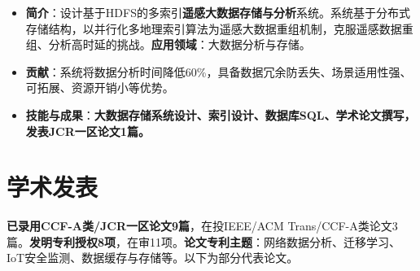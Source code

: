 \documentclass[UTF8,letterpaper,11pt]{article}
\begin{document}
\begin{itemize}
  \setlength\itemsep{2.0pt}
  \item \textbf{简介}：设计基于HDFS的多索引\textbf{遥感大数据存储与分析}系统。系统基于分布式存储结构，以并行化多地理索引算法为遥感大数据重组机制，克服遥感数据重组、分析高时延的挑战。\textbf{应用领域}：大数据分析与存储。
  \item \textbf{贡献}：系统将数据分析时间降低60\%，具备数据冗余防丢失、场景适用性强、可拓展、资源开销小等优势。
  \item \textbf{技能与成果}：\textbf{大数据存储系统设计、索引设计、数据库SQL、学术论文撰写，发表JCR一区论文1篇。}
\end{itemize}




\section{\textbf{学术发表}}

\textbf{已录用CCF-A类/JCR一区论文9篇}，在投IEEE/ACM Trans/CCF-A类论文3篇。\textbf{发明专利授权8项}，在审11项。\textbf{论文专利主题}：网络数据分析、迁移学习、IoT安全监测、数据缓存与存储等。以下为部分代表论文。
\end{document}
